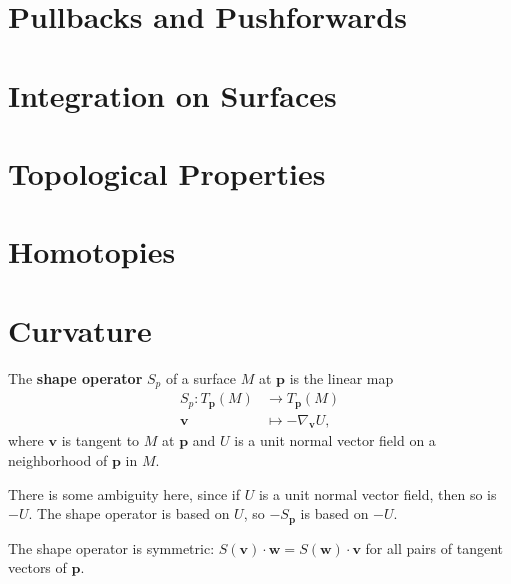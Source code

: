 \documentclass[10pt]{report}
\begin{document}

\section{Pullbacks and Pushforwards}


\section{Integration on Surfaces}



\section{Topological Properties}


\section{Homotopies}



\section{Curvature}

\begin{defn}[]
The \textbf{shape operator} $S_p$ of a surface $M$ at $\mathbf{p}$ is the linear map
\begin{align*}
	S_p: T_{\mathbf{p}}(M)&\to T_{\mathbf{p}}(M)\\
	\mathbf{v} &\mapsto  -\nabla_{\mathbf{v}}U,
\end{align*}
where $\mathbf{v}$ is tangent to $M$ at $\mathbf{p}$ and $U$ is a unit normal vector field on a neighborhood of $\mathbf{p}$ in $M$.
\end{defn}

There is some ambiguity here, since if $U$ is a unit normal vector field, then so is $-U$. The shape operator is based on $U$, so $-S_{\mathbf{p}}$ is based on $-U$.

The shape operator is symmetric: $S(\mathbf{v}) \cdot \mathbf{w} = S(\mathbf{w})\cdot \mathbf{v}$ for all pairs of tangent vectors of $\mathbf{p}$.
\end{document}
